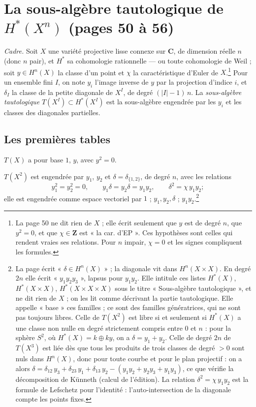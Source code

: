 \documentclass[11pt,a4paper]{article}
\begin{document}
\section*{La sous-algèbre tautologique de $H^{*}(X^{n})$ (pages 50 à 56)}

\emph{Cadre.} Soit $X$ une variété projective lisse connexe sur $\mathbf{C}$,
de dimension réelle $n$ (donc $n$ pair), et $H^{*}$ sa cohomologie rationnelle
--- ou toute cohomologie de Weil ; soit $y \in H^{n}(X)$ la classe d'un point
et $\chi$ la caractéristique d'Euler de $X$.\footnote{La page 50 ne dit rien
de $X$ ; elle écrit seulement que $y$ est de degré $n$, que $y^{2} = 0$, et que
$\chi \in \mathbf{Z}$ est « la car. d'EP ». Ces hypothèses sont celles qui
rendent vraies ses relations. Pour $n$ impair, $\chi = 0$ et les signes
compliquent les formules.} Pour un ensemble fini $I$, on note $y_{i}$
l'image inverse de $y$ par la projection d'indice $i$, et $\delta_{I}$ la
classe de la petite diagonale de $X^{I}$, de degré $(|I| - 1)\,n$. La
\emph{sous-algèbre tautologique} $T(X^{I}) \subset H^{*}(X^{I})$ est la
sous-algèbre engendrée par les $y_{i}$ et les classes des diagonales partielles.

\subsection*{Les premières tables}

$T(X)$ a pour base $1$, $y$, avec $y^{2} = 0$.

$T(X^{2})$ est engendrée par $y_{1}$, $y_{2}$ et $\delta = \delta_{\{1,2\}}$,
de degré $n$, avec les relations
\[ y_{1}^{2} = y_{2}^{2} = 0 , \qquad y_{1}\delta = y_{2}\delta = y_{1}y_{2} , \qquad \delta^{2} = \chi\, y_{1}y_{2} ; \]
elle est engendrée comme espace vectoriel par $1$ ; $y_{1}, y_{2}, \delta$ ;
$y_{1}y_{2}$.\footnote{La page écrit « $\delta \in H^{n}(X)$ » ; la diagonale
vit dans $H^{n}(X \times X)$. En degré $2n$ elle écrit « $y_{1}y_{2}y_{3}$ »,
lapsus pour $y_{1}y_{2}$. Elle intitule ces listes $H^{*}(X)$,
$H^{*}(X \times X)$, $H^{*}(X \times X \times X)$ sous le titre « Sous-algèbre
tautologique », et ne dit rien de $X$ ; on les lit comme décrivant la partie
tautologique. Elle appelle « base » ces familles ; ce sont des familles
génératrices, qui ne sont pas toujours libres. Celle de $T(X^{2})$ est libre
si et seulement si $H^{*}(X)$ a une classe non nulle en degré strictement
compris entre $0$ et $n$ : pour la sphère $S^{2}$, où $H^{*}(X) = k \oplus k
y$, on a $\delta = y_{1} + y_{2}$. Celle de degré $2n$ de $T(X^{3})$ est liée
dès que tous les produits de trois classes de degré $> 0$ sont nuls dans
$H^{n}(X)$, donc pour toute courbe et pour le plan projectif : on a alors
$\delta = \delta_{12}\,y_{3} + \delta_{23}\,y_{1} + \delta_{13}\,y_{2} -
(y_{1}y_{2} + y_{2}y_{3} + y_{1}y_{3})$, ce que vérifie la décomposition de
Künneth (calcul de l'édition). La relation $\delta^{2} = \chi\, y_{1}y_{2}$ est la formule de Lefschetz pour
l'identité : l'auto-intersection de la diagonale compte les points fixes.}
\end{document}
